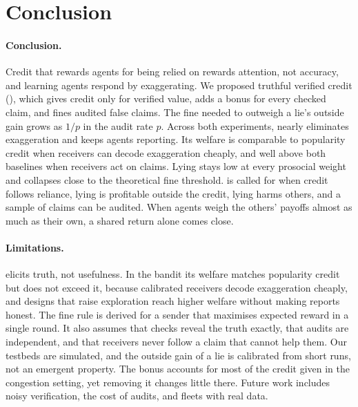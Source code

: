 \section{Conclusion}
\label{sec:conclusion}

\paragraph{Conclusion.}
Credit that rewards agents for being relied on rewards attention, not accuracy, and learning agents respond by exaggerating. We proposed truthful verified credit (\tvc{}), which gives credit only for verified value, adds a bonus for every checked claim, and fines audited false claims. The fine needed to outweigh a lie's outside gain grows as $1/p$ in the audit rate $p$. Across both experiments, \tvc{} nearly eliminates exaggeration and keeps agents reporting. Its welfare is comparable to popularity credit when receivers can decode exaggeration cheaply, and well above both baselines when receivers act on claims. Lying stays low at every prosocial weight and collapses close to the theoretical fine threshold. \tvc{} is called for when credit follows reliance, lying is profitable outside the credit, lying harms others, and a sample of claims can be audited. When agents weigh the others' payoffs almost as much as their own, a shared return alone comes close.

\paragraph{Limitations.}
\tvc{} elicits truth, not usefulness. In the bandit its welfare matches popularity credit but does not exceed it, because calibrated receivers decode exaggeration cheaply, and designs that raise exploration reach higher welfare without making reports honest. The fine rule is derived for a sender that maximises expected reward in a single round. It also assumes that checks reveal the truth exactly, that audits are independent, and that receivers never follow a claim that cannot help them. Our testbeds are simulated, and the outside gain of a lie is calibrated from short runs, not an emergent property. The bonus accounts for most of the credit given in the congestion setting, yet removing it changes little there. Future work includes noisy verification, the cost of audits, and fleets with real data.
